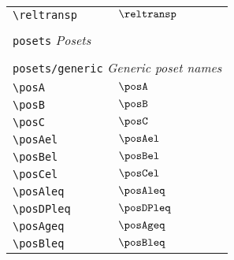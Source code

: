 \begin{longtable}{lll}
  {\color[rgb]{0.5,0.5,0.5}\texttt{\textbackslash reltransp}}                                               & $\reltransp$               &                                                         \\
  &                            &                                                         \\
  \multicolumn{3}{l}{{\color[rgb]{0.5,0.5,0.5}\texttt{posets}} \emph{Posets}} \\
  \hline
  \hline
  &                            &                                                         \\
  \multicolumn{3}{l}{{\color[rgb]{0.5,0.5,0.5}\texttt{posets/generic}} \emph{Generic poset names}}
  \\
  \hline
  {\color[rgb]{0.5,0.5,0.5}\texttt{\textbackslash posA}}                                                    & $\posA$                    & \\
  {\color[rgb]{0.5,0.5,0.5}\texttt{\textbackslash posB}}                                                    & $\posB$                    & \\
  {\color[rgb]{0.5,0.5,0.5}\texttt{\textbackslash posC}}                                                    & $\posC$                    & \\
  {\color[rgb]{0.5,0.5,0.5}\texttt{\textbackslash posAel}}                                                  & $\posAel$                  & \\
  {\color[rgb]{0.5,0.5,0.5}\texttt{\textbackslash posBel}}                                                  & $\posBel$                  & \\
  {\color[rgb]{0.5,0.5,0.5}\texttt{\textbackslash posCel}}                                                  & $\posCel$                  & \\
  {\color[rgb]{0.5,0.5,0.5}\texttt{\textbackslash posAleq}}                                                 & $\posAleq$                 & \\
  {\color[rgb]{0.5,0.5,0.5}\texttt{\textbackslash posDPleq}}                                                & $\posDPleq$                & \\
  {\color[rgb]{0.5,0.5,0.5}\texttt{\textbackslash posAgeq}}                                                 & $\posAgeq$                 & \\
  {\color[rgb]{0.5,0.5,0.5}\texttt{\textbackslash posBleq}}                                                 & $\posBleq$                 & \\

\end{longtable}
